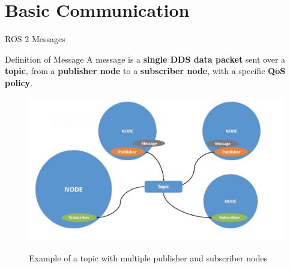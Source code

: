 
\section{Basic Communication}
\graphicspath{{figs/section3/}}

\begin{frame}{ROS 2 Messages}
    \begin{block}{Definition of Message}
      A message is a \textbf{single DDS data packet} sent over a \textbf{topic}, from a \textbf{publisher node} to a \textbf{subscriber node}, with a specific \textbf{QoS policy}.
    \end{block}
    \begin{figure}
      \centering
      \includegraphics[scale=.19]{ros2Msg.jpg}
      \label{fig:msg}
      \caption{Example of a topic with multiple publisher and subscriber nodes}
    \end{figure}
\end{frame}
